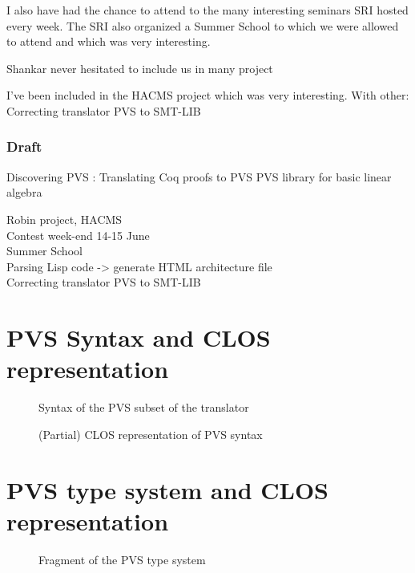 \documentclass[12pt,a4paper,titlepage]{article}
\begin{document}
I also have had the chance to attend to the many interesting seminars SRI hosted every week.
The SRI also organized a Summer School to which we were allowed to attend and which was very interesting.

Shankar never hesitated to include us in many project

I've been included in the HACMS project which was very interesting.
With other:
Correcting translator PVS to SMT-LIB




\subsubsection*{Draft}
Discovering PVS :
Translating Coq proofs to PVS
PVS library for basic linear algebra

Robin project, HACMS \\
Contest week-end 14-15 June \\
Summer School \\
Parsing Lisp code -> generate HTML architecture file\\
Correcting translator PVS to SMT-LIB
\cite{pavol}












\appendix

\newpage
\section{PVS Syntax and CLOS representation}

\begin{figure}[h]

\caption{Syntax of the PVS subset of the translator}
\label{fig:PVSsyntax}
\end{figure}

\begin{figure}[!ht]

\caption{(Partial) CLOS representation of PVS syntax}
\label{fig:PVS-CLOS}
\end{figure}

\newpage
\section{PVS type system and CLOS representation}

\begin{figure}[!ht]

\caption{Fragment of the PVS type system}
\label{fig:PVS-types}
\end{figure}
\end{document}
